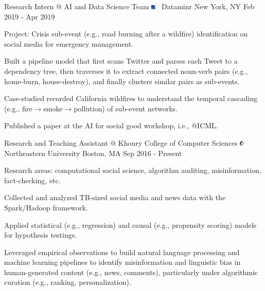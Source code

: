 \documentclass[letterpaper]{awesome-cv}
\begin{document}
\begin{cventries}
{\begin{cvitems}
      \end{cvitems}
    }
  \cventry
    {Research Intern @ AI and Data Science Team}
    {\includegraphics[width=0.016\textwidth]{../images/logos/dataminr.png}~ Dataminr}
    {New York, NY}
    {Feb 2019 - Apr 2019}
    {
      \begin{cvitems}
        \item {Project: Crisis sub-event (e.g., road burning after a wildfire) identification on social media for emergency management.}
        \item {Built a pipeline model that first scans Twitter and parses each Tweet to a dependency tree, then traverses it to extract connected noun-verb pairs (e.g., home-burn, house-destroy), and finally clusters similar pairs as sub-events.}
        \item {Case-studied recorded California wildfires to understand the temporal cascading (e.g., fire$\to$smoke$\to$pollution) of sub-event networks.}
        \item {Published a paper at the AI for social good workshop, i.e., @ICML.}
      \end{cvitems}
    }
  \cventry
    {Research and Teaching Assistant @ Khoury College of Computer Sciences}
    {\includegraphics[width=0.016\textwidth]{../images/logos/northeastern.png}~ Northeastern University}
    {Boston, MA}
    {Sep 2016 - Present}
    {
      \begin{cvitems}
        \item {Research areas: computational social science, algorithm auditing, misinformation, fact-checking, etc.}
        \item {Collected and analyzed TB-sized social media and news data with the Spark/Hadoop framework.}
        \item {Applied statistical (e.g., regression) and causal (e.g., propensity scoring) models for hypothesis testings.}
        \item {Leveraged empirical observations to build natural language processing and machine learning pipelines to identify misinformation and linguistic bias in human-generated content (e.g., news, comments), particularly under algorithmic curation (e.g., ranking, personalization).}

\end{cvitems}}
\end{cventries}
\end{document}
